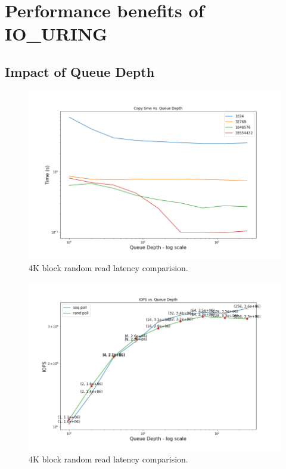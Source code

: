 \documentclass{article}
\begin{document}
\section{Performance benefits of IO\_URING}
\subsection{Impact of Queue Depth}

\begin{figure}
    \centering
    \includegraphics[scale = 0.25]{cp_qd.png}
    \caption{4K block random read latency comparision.}
    \label{Figure3}
\end{figure}

\begin{figure}
    \centering
    \includegraphics[scale = 0.25]{queue_depth.png}
    \caption{4K block random read latency comparision.}
    \label{Figure4}
\end{figure}
\end{document}
